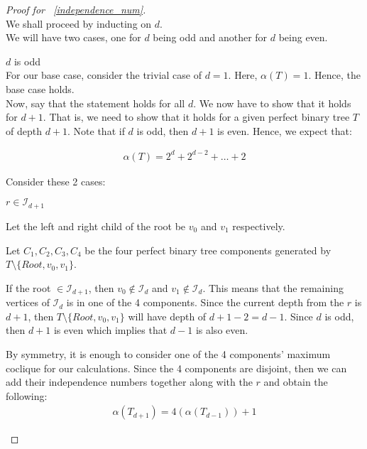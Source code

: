 \begin{proof}[Proof for ~\ref{independence_num}]
	$ $ \\
	We shall proceed by inducting on $d$.\\
	We will have two cases, one for $d$ being odd and another for $d$ being even.
	\begin{caseof}
		\item $d$ is odd \\

		For our base case, consider the trivial case of $d = 1$. Here, $\alpha(T) = 1$. Hence, the base case holds. \\

		Now, say that the statement holds for all $d$. We now have to show that it holds for $d+1$. That is, we need to show that it holds for a given perfect binary tree $T$ of depth $d + 1$. Note that if $d$ is odd, then $d + 1$ is even. Hence, we expect that:

		\begin{align*}
			\alpha(T) = 2^d + 2^{d - 2} + \ldots + 2 
		\end{align*}

		Consider these 2 cases:

		\begin{subcaseof}
			\item $r \in \mathcal{I}_{d + 1}$

			Let the left and right child of the root be $v_0$ and $v_1$ respectively.

			Let $C_1, C_2, C_3, C_4$ be the four perfect binary tree components generated by $T \setminus \{Root, v_0, v_1\}$.

			If the root $\in \mathcal{I}_{d + 1}$, then $v_0 \not\in \mathcal{I}_d$ and $v_1 \not\in \mathcal{I}_d$. This means that the remaining vertices of $\mathcal{I}_d$ is in one of the 4 components.
			Since the current depth from the $r$ is $d + 1$, then $T \setminus \{Root, v_0, v_1\}$ will have depth of $d + 1 - 2 = d - 1$. Since $d$ is odd, then $d + 1$ is even which implies that $d - 1$ is also even.

			By symmetry, it is enough to consider one of the 4 components' maximum coclique for our calculations. Since the 4 components are disjoint, then we can add their independence numbers together along with the $r$ and obtain the following:
			\begin{align*}
				\alpha(T_{d + 1}) = 4(\alpha(T_{d - 1})) + 1
			\end{align*}


\end{subcaseof}
\end{caseof}
\end{proof}
